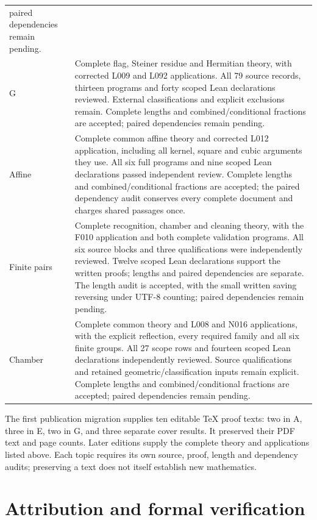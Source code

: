 \documentclass[11pt,a4paper]{article}
\begin{document}
\begin{longtable}{p{}p{}}
paired dependencies remain pending.\\
G & Complete flag, Steiner residue and Hermitian theory, with corrected
L009 and L092 applications. All 79 source records, thirteen programs and
forty scoped Lean declarations reviewed. External classifications and
explicit exclusions remain. Complete lengths and combined/conditional
fractions are accepted; paired dependencies remain pending.\\
Affine & Complete common affine theory and corrected L012 application,
including all kernel, square and cubic arguments they use. All six full
programs and nine scoped Lean declarations passed independent review.
Complete lengths and combined/conditional fractions are accepted;
the paired dependency audit conserves every complete document and
charges shared passages once.\\
Finite pairs & Complete recognition, chamber and cleaning theory, with the
F010 application and both complete validation programs. All six source
blocks and three qualifications were independently reviewed. Twelve scoped
Lean declarations support the written proofs; lengths and paired
dependencies are separate. The length audit is accepted, with the small
written saving reversing under UTF-8 counting; paired dependencies remain
pending.\\
Chamber & Complete common theory and L008 and N016 applications, with
the explicit reflection, every required family and all six finite groups.
All 27 scope rows and fourteen scoped Lean declarations independently
reviewed. Source qualifications and retained geometric/classification inputs
remain explicit. Complete lengths and combined/conditional fractions are
accepted; paired dependencies remain pending.\\\bottomrule
\end{longtable}

The first publication migration supplies ten editable TeX proof texts:
two in A, three in E, two in G, and three separate cover results. It preserved
their PDF text and page counts. Later editions supply the complete theory
and applications listed above. Each topic requires its own source, proof,
length and dependency audits; preserving a text does not itself establish
new mathematics.

\section{Attribution and formal verification}
\end{document}

